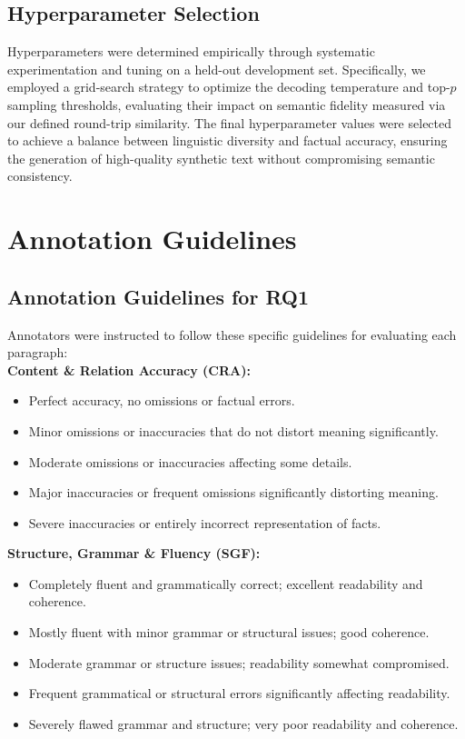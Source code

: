 \documentclass[11pt]{article}
\begin{document}
\subsection{Hyperparameter Selection}\label{appendix:params_selection}
Hyperparameters were determined empirically through systematic experimentation and tuning on a held-out development set. Specifically, we employed a grid-search strategy to optimize the decoding temperature and top-$p$ sampling thresholds, evaluating their impact on semantic fidelity measured via our defined round-trip similarity. The final hyperparameter values were selected to achieve a balance between linguistic diversity and factual accuracy, ensuring the generation of high-quality synthetic text without compromising semantic consistency.
\section{Annotation Guidelines}
\label{appendix:guidelines}

\subsection{Annotation Guidelines for RQ1}
\label{appendix:guidelines1}

Annotators were instructed to follow these specific guidelines for evaluating each paragraph:\\

\noindent\textbf{Content \& Relation Accuracy (CRA):}
\begin{itemize}
\item[A:] Perfect accuracy, no omissions or factual errors.
\item[B:] Minor omissions or inaccuracies that do not distort meaning significantly.
\item[C:] Moderate omissions or inaccuracies affecting some details.
\item[D:] Major inaccuracies or frequent omissions significantly distorting meaning.
\item[E:] Severe inaccuracies or entirely incorrect representation of facts.
\end{itemize}

\noindent\textbf{Structure, Grammar \& Fluency (SGF):}
\begin{itemize}
\item[A:] Completely fluent and grammatically correct; excellent readability and coherence.
\item[B:] Mostly fluent with minor grammar or structural issues; good coherence.
\item[C:] Moderate grammar or structure issues; readability somewhat compromised.
\item[D:] Frequent grammatical or structural errors significantly affecting readability.
\item[E:] Severely flawed grammar and structure; very poor readability and coherence.
\end{itemize}
\end{document}
